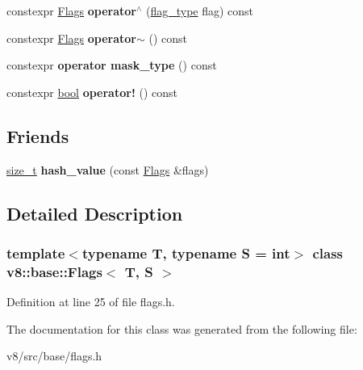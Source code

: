 \begin{DoxyCompactItemize}
\item 
\mbox{\label{classv8_1_1base_1_1Flags_ae971220f4f4f7fab32413335b81180a5}} 
constexpr \mbox{\hyperlink{classv8_1_1base_1_1Flags}{Flags}} {\bfseries operator$^\wedge$} (\mbox{\hyperlink{classv8_1_1internal_1_1torque_1_1T}{flag\+\_\+type}} flag) const
\item 
\mbox{\label{classv8_1_1base_1_1Flags_a1a873e408b55b83944dbda5cba7adc2a}} 
constexpr \mbox{\hyperlink{classv8_1_1base_1_1Flags}{Flags}} {\bfseries operator$\sim$} () const
\item 
\mbox{\label{classv8_1_1base_1_1Flags_afa1f1bc24b38597d407524a7fc86749f}} 
constexpr {\bfseries operator mask\+\_\+type} () const
\item 
\mbox{\label{classv8_1_1base_1_1Flags_a0597d7414cb60e3f16e70b1b34d6e50a}} 
constexpr \mbox{\hyperlink{classbool}{bool}} {\bfseries operator!} () const
\end{DoxyCompactItemize}
\subsection*{Friends}
\begin{DoxyCompactItemize}
\item 
\mbox{\label{classv8_1_1base_1_1Flags_a798e1ab62fe51cbaa2525ac9f01f460b}} 
\mbox{\hyperlink{classsize__t}{size\+\_\+t}} {\bfseries hash\+\_\+value} (const \mbox{\hyperlink{classv8_1_1base_1_1Flags}{Flags}} \&flags)
\end{DoxyCompactItemize}


\subsection{Detailed Description}
\subsubsection*{template$<$typename T, typename S = int$>$\newline
class v8\+::base\+::\+Flags$<$ T, S $>$}



Definition at line 25 of file flags.\+h.



The documentation for this class was generated from the following file\+:\begin{DoxyCompactItemize}
\item 
v8/src/base/flags.\+h\end{DoxyCompactItemize}
